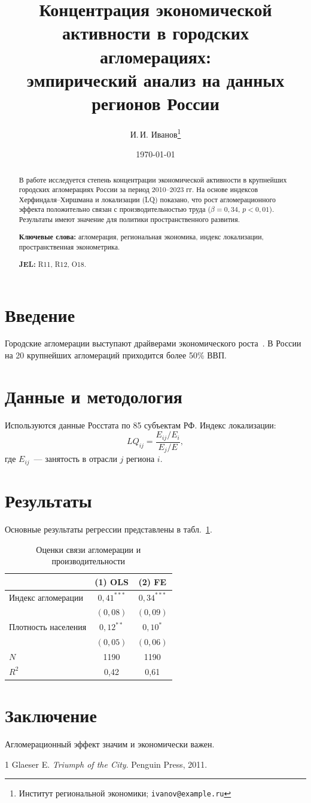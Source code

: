 \documentclass[12pt,a4paper]{article}
\title{Концентрация экономической активности в городских агломерациях:\\
эмпирический анализ на данных регионов России}
\author{И.\,И. Иванов\thanks{Институт региональной экономики; \texttt{ivanov@example.ru}}}
\date{\today}
\begin{document}
\maketitle

\begin{abstract}
\noindent В работе исследуется степень концентрации экономической активности
в крупнейших городских агломерациях России за период 2010--2023 гг.
На основе индексов Херфиндаля--Хиршмана и локализации (LQ) показано,
что рост агломерационного эффекта положительно связан с производительностью труда
($\beta = 0{,}34$, $p < 0{,}01$). Результаты имеют значение для политики
пространственного развития.

\medskip\noindent\textbf{Ключевые слова:} агломерация, региональная экономика,
индекс локализации, пространственная эконометрика.

\medskip\noindent\textbf{JEL:} R11, R12, O18.
\end{abstract}

\section{Введение}
Городские агломерации выступают драйверами экономического роста~\citep{glaeser2011}.
В России на 20 крупнейших агломераций приходится более 50\% ВВП.

\section{Данные и методология}
Используются данные Росстата по 85 субъектам РФ. Индекс локализации:
\begin{equation}
    LQ_{ij} = \frac{E_{ij}/E_i}{E_j/E},
    \label{eq:lq}
\end{equation}
где $E_{ij}$~--- занятость в отрасли $j$ региона $i$.

\section{Результаты}
Основные результаты регрессии представлены в табл.~\ref{tab:main}.

\begin{table}[htbp]
\centering
\caption{Оценки связи агломерации и производительности}
\label{tab:main}
\begin{tabular}{lcc}
\toprule
 & (1) OLS & (2) FE \\
\midrule
Индекс агломерации & $0{,}41^{***}$ & $0{,}34^{***}$ \\
                   & $(0{,}08)$     & $(0{,}09)$     \\
Плотность населения & $0{,}12^{**}$ & $0{,}10^{*}$   \\
                   & $(0{,}05)$     & $(0{,}06)$     \\
\midrule
$N$ & 1190 & 1190 \\
$R^2$ & 0{,}42 & 0{,}61 \\
\bottomrule
\end{tabular}
\end{table}

\section{Заключение}
Агломерационный эффект значим и экономически важен.


\begin{thebibliography}{1}
Glaeser E. \emph{Triumph of the City}. Penguin Press, 2011.
\end{thebibliography}
\end{document}
